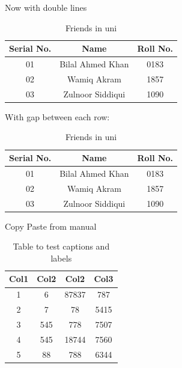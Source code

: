 \documentclass[10pt]{article}
\begin{document}
Now with double lines

\begin{table}[h!]
\centering
\begin{tabular}{||c|| c|| c||}
    \hline\hline
     Serial No.& Name & Roll No.  \\\hline\hline
     01 & Bilal Ahmed Khan & 0183 \\\hline\hline
     02 & Wamiq Akram & 1857 \\\hline\hline
     03 & Zulnoor Siddiqui & 1090 \\\hline\hline
\end{tabular}
\caption{Friends in uni}
\end{table}

With gap between each row:

\begin{table}[h!]
\centering
\begin{tabular}{||c ||c|| c||}
    \hline\hline
     Serial No.& Name & Roll No.  \\[2ex]
     \hline\hline 
     01 & Bilal Ahmed Khan & 0183 \\\hline\hline
     02 & Wamiq Akram & 1857 \\\hline\hline
     03 & Zulnoor Siddiqui & 1090 \\\hline\hline
\end{tabular}
\caption{Friends in uni}
\end{table}
\newpage
Copy Paste from manual
\begin{table}[h!]
\centering
\begin{tabular}{||c c c c||}
\hline
Col1 & Col2 & Col2 & Col3 \\ [0.5ex]
\hline\hline
1 & 6 & 87837 & 787 \\
\hline
2 & 7 & 78 & 5415 \\
\hline
3 & 545 & 778 & 7507 \\
\hline
4 & 545 & 18744 & 7560 \\
\hline
5 & 88 & 788 & 6344 \\ [1ex]
\hline
\end{tabular}
\caption{Table to test captions and labels}
\end{table}
\end{document}

